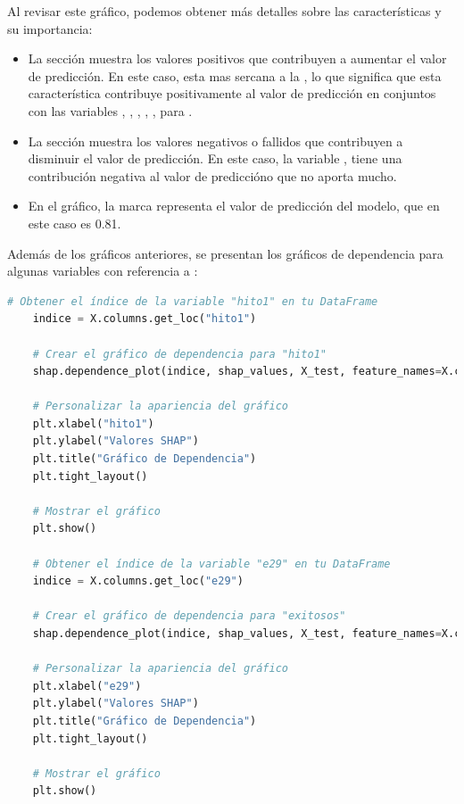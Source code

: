 Al revisar este gráfico, podemos obtener más detalles sobre las características y su importancia:

\begin{itemize}
    \item La sección  muestra los valores positivos que contribuyen a aumentar el valor de predicción. En este caso,  esta mas sercana a la , lo que significa que esta característica contribuye positivamente al valor de predicción en conjuntos con las variables , , , , ,  para .
    \item La sección  muestra los valores negativos o fallidos que contribuyen a disminuir el valor de predicción. En este caso, la variable , tiene una contribución negativa al valor de prediccióno que no aporta mucho.
    \item En el gráfico, la marca  representa el valor de predicción del modelo, que en este caso es 0.81.
\end{itemize}

Además de los gráficos anteriores, se presentan los gráficos de dependencia para algunas variables con referencia a :

\begin{lstlisting}[language=Python, caption=Grafico de dependencia hito1  e29, label=lst:grafDepHito1e29]
    # Obtener el índice de la variable "hito1" en tu DataFrame
    indice = X.columns.get_loc("hito1")
    
    # Crear el gráfico de dependencia para "hito1"
    shap.dependence_plot(indice, shap_values, X_test, feature_names=X.columns, show=False)
    
    # Personalizar la apariencia del gráfico
    plt.xlabel("hito1")
    plt.ylabel("Valores SHAP")
    plt.title("Gráfico de Dependencia")
    plt.tight_layout()
    
    # Mostrar el gráfico
    plt.show()

    # Obtener el índice de la variable "e29" en tu DataFrame
    indice = X.columns.get_loc("e29")

    # Crear el gráfico de dependencia para "exitosos"
    shap.dependence_plot(indice, shap_values, X_test, feature_names=X.columns, show=False)

    # Personalizar la apariencia del gráfico
    plt.xlabel("e29")
    plt.ylabel("Valores SHAP")
    plt.title("Gráfico de Dependencia")
    plt.tight_layout()

    # Mostrar el gráfico
    plt.show()
\end{lstlisting}

